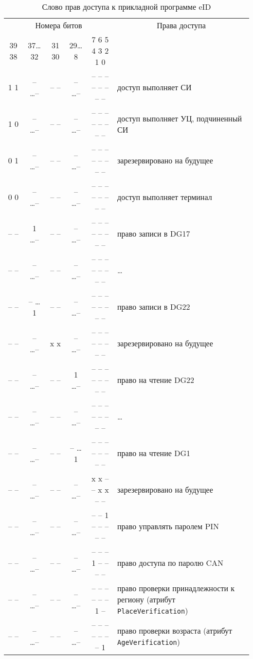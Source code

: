 \begin{table}[h!]
\caption{Слово прав доступа к прикладной программе eID}
\label{Table.DATA.Access}
\begin{tabular}{|c|c|c|c|c|p{7cm}|}
\hline
\multicolumn{5}{|c|}{Номера битов}&
\multicolumn{1}{c|}{Права доступа}\\
\cline{1-5}
39 38 &	37\dots 32 & 31 30 & 29\dots 8 & 7  6  5  4  3  2  1  0 &	\\
\hline
\hline 
 1   1 &	 – \dots – &	 –  – &	 –  \dots  – &	–  –  –  –  –  –  –  – & 
доступ выполняет СИ\\ 
\hline 
 1   0 &	 – \dots – &	 –  – &	 –  \dots  – &	–  –  –  –  –  –  –  – & 
доступ выполняет УЦ, подчиненный СИ \\
\hline 
 0   1 &	 – \dots – &	 –  – &	 –  \dots  – &	–  –  –  –  –  –  –  – & 
зарезервировано на будущее\\
\hline 
 0   0 &	 – \dots – &	 –  – &	 –  \dots  – &	–  –  –  –  –  –  –  – & 
доступ выполняет терминал\\
\hline 
 –   – &	 1 \dots – &	 –  – &	 –  \dots  – &	–  –  –  –  –  –  –  – & 
право записи в DG17\\
\hline 
 –   – &	 – \dots – &	 –  – &	 –  \dots  – &	–  –  –  –  –  –  –  – & 
\dots  \\
\hline 
 –   – &	 – \dots 1 &	 –  – &	 –  \dots  – &	–  –  –  –  –  –  –  – & 
право записи в DG22\\
\hline 
 –   – &	 – \dots – &	 x  x &	 –  \dots  – &	–  –  –  –  –  –  –  – & 
зарезервировано на будущее\\
\hline 
 –   – &	 – \dots – &	 –  – &	 1  \dots  – &	–  –  –  –  –  –  –  – & 
право на чтение DG22\\
\hline 
 –   – &	 – \dots – &	 –  – &	 – \dots – &	–  –  –  –  –  –  –  – & 
\dots\\
\hline 
 –   – &	 – \dots – &	 –  – &	 –  \dots  1 &	–  –  –  –  –  –  –  – & 
право на чтение DG1\\
\hline 
 –   – &	 – \dots – &	 –  – &	 –  \dots  – &	x  x  –  –  x  x  –  – & 
зарезервировано на будущее\\
\hline 
 –   – &	 – \dots – &	 –  – &	 –  \dots  – &	–  –  1  –  –  –  –  – & 
право управлять паролем PIN\\
\hline 
 –   – &	 – \dots – &	 –  – &	 –  \dots  – &	–  –  –  1  –  –  –  – & 
право доступа по паролю CAN\\
\hline 
 –   – &	 – \dots – &	 –  – &	 –  \dots  – &	–  –  –  –  –  –  1  – & 
право проверки принадлежности к региону (атрибут \verb|PlaceVerification|)\\
\hline 
 –   – &	 – \dots – &	 –  – &	 –  \dots  – &	–  –  –  –  –  –  –  1 & 
право проверки возраста (атрибут \verb|AgeVerification|)\\
\hline                                                                           
\end{tabular}
\end{table}
                                                                             
